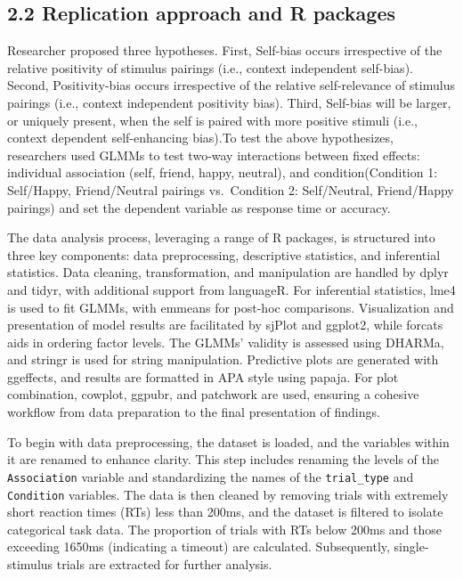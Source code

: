 \documentclass[
  man]{apa6}
\begin{document}
\subsection{2.2 Replication approach and R packages}\label{replication-approach-and-r-packages}

Researcher proposed three hypotheses. First, Self-bias occurs irrespective of the relative positivity of stimulus pairings (i.e., context independent self-bias). Second, Positivity-bias occurs irrespective of the relative self-relevance of stimulus pairings (i.e., context independent positivity bias). Third, Self-bias will be larger, or uniquely present, when the self is paired with more positive stimuli (i.e., context dependent self-enhancing bias).To test the above hypothesizes, researchers used GLMMs to test two-way interactions between fixed effects: individual association (self, friend, happy, neutral), and condition(Condition 1: Self/Happy, Friend/Neutral pairings vs.~Condition 2: Self/Neutral, Friend/Happy pairings) and set the dependent variable as response time or accuracy.

The data analysis process, leveraging a range of R packages, is structured into three key components: data preprocessing, descriptive statistics, and inferential statistics. Data cleaning, transformation, and manipulation are handled by dplyr and tidyr, with additional support from languageR. For inferential statistics, lme4 is used to fit GLMMs, with emmeans for post-hoc comparisons. Visualization and presentation of model results are facilitated by sjPlot and ggplot2, while forcats aids in ordering factor levels. The GLMMs' validity is assessed using DHARMa, and stringr is used for string manipulation. Predictive plots are generated with ggeffects, and results are formatted in APA style using papaja. For plot combination, cowplot, ggpubr, and patchwork are used, ensuring a cohesive workflow from data preparation to the final presentation of findings.

To begin with data preprocessing, the dataset is loaded, and the variables within it are renamed to enhance clarity. This step includes renaming the levels of the \texttt{Association} variable and standardizing the names of the \texttt{trial\_type} and \texttt{Condition} variables. The data is then cleaned by removing trials with extremely short reaction times (RTs) less than 200ms, and the dataset is filtered to isolate categorical task data. The proportion of trials with RTs below 200ms and those exceeding 1650ms (indicating a timeout) are calculated. Subsequently, single-stimulus trials are extracted for further analysis.
\end{document}
